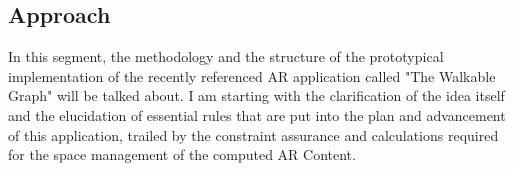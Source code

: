 \documentclass[12pt,a4paper,oneside,american,parskip=half]{article}
\begin{document}
\begin{justify}
\begin{normalsize}

\clearpage
\section{Approach}
In this segment, the methodology and the structure of the prototypical implementation of the recently referenced AR application called "The Walkable Graph" will be talked about. I am starting with the clarification of the idea itself and the elucidation of essential rules that are put into the plan and advancement of this application, trailed by the constraint assurance and calculations required for the space management of the computed AR Content.


\end{normalsize}
\end{justify}
\end{document}
